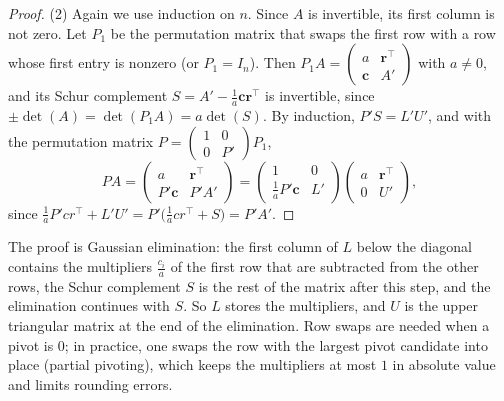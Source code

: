 \documentclass[11pt]{article}
\theoremstyle{definition}
\theoremstyle{plain}
\theoremstyle{remark}
\begin{document}
\begin{proof}
    (2) Again we use induction on $n$. Since $A$ is invertible, its first column is not zero. Let $P_1$ be the permutation matrix that swaps the first row with a row whose first entry is nonzero (or $P_1 = I_n$). Then $P_1A = \begin{pmatrix} a & \mathbf{r}^\top \\ \mathbf{c} & A' \end{pmatrix}$ with $a \neq 0$, and its Schur complement $S = A' - \frac{1}{a}\mathbf{c}\mathbf{r}^\top$ is invertible, since $\pm\det(A) = \det(P_1A) = a\det(S)$. By induction, $P'S = L'U'$, and with the permutation matrix $P = \begin{pmatrix} 1 & 0 \\ 0 & P' \end{pmatrix}P_1$,
    \[PA = \begin{pmatrix} a & \mathbf{r}^\top \\ P'\mathbf{c} & P'A' \end{pmatrix} = \begin{pmatrix} 1 & 0 \\ \frac{1}{a}P'\mathbf{c} & L' \end{pmatrix}\begin{pmatrix} a & \mathbf{r}^\top \\ 0 & U' \end{pmatrix},\]
    since $\frac{1}{a}P'cr^\top + L'U' = P'\big(\frac{1}{a}cr^\top + S\big) = P'A'$.
\end{proof}

The proof is Gaussian elimination: the first column of $L$ below the diagonal contains the multipliers $\frac{c_i}{a}$ of the first row that are subtracted from the other rows, the Schur complement $S$ is the rest of the matrix after this step, and the elimination continues with $S$. So $L$ stores the multipliers, and $U$ is the upper triangular matrix at the end of the elimination. Row swaps are needed when a pivot is $0$; in practice, one swaps the row with the largest pivot candidate into place (partial pivoting), which keeps the multipliers at most $1$ in absolute value and limits rounding errors.
\end{document}

